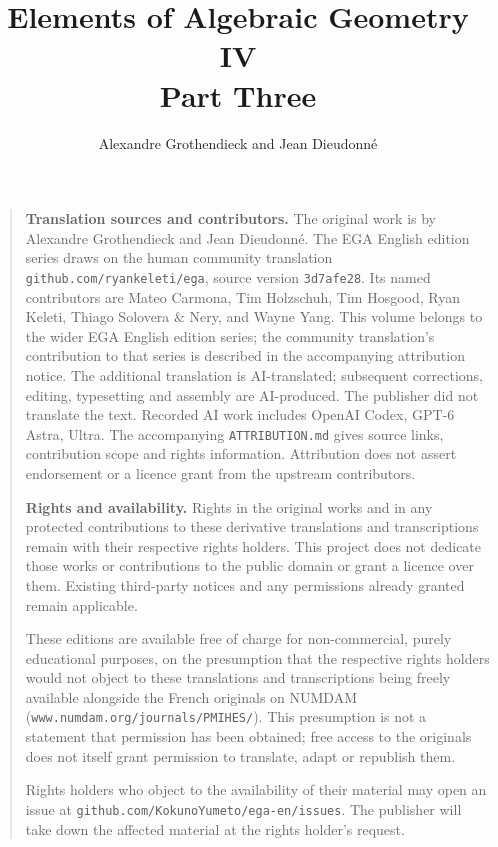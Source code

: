 


\setlength{\emergencystretch}{3em}




\title{Elements of Algebraic Geometry IV\\Part Three}
\author{Alexandre Grothendieck and Jean Dieudonn\'e}
\date{}
\maketitle


\begingroup
\small
\begin{quote}
\textbf{Translation sources and contributors.}
The original work is by Alexandre Grothendieck and Jean Dieudonn\'e.
The EGA English edition series draws on the human community translation
\texttt{github.com/ryankeleti/ega}, source version \texttt{3d7afe28}.
Its named contributors are Mateo Carmona, Tim Holzschuh, Tim Hosgood,
Ryan Keleti, Thiago Solovera \& Nery, and Wayne Yang.
This volume belongs to the wider EGA English edition series; the community translation's contribution to that series is described in the accompanying attribution notice.
The additional translation is AI-translated; subsequent corrections, editing,
typesetting and assembly are AI-produced. The publisher did not translate
the text. Recorded AI work includes OpenAI Codex,
GPT-6 Astra, Ultra.
The accompanying \texttt{ATTRIBUTION.md} gives source links, contribution
scope and rights information. Attribution does not assert endorsement
or a licence grant from the upstream contributors.

\medskip
\textbf{Rights and availability.}
Rights in the original works and in any protected contributions to these
derivative translations and transcriptions remain with their respective
rights holders. This project does not dedicate those works or contributions
to the public domain or grant a licence over them. Existing third-party
notices and any permissions already granted remain applicable.

These editions are available free of charge for non-commercial, purely
educational purposes, on the presumption that the respective rights holders
would not object to these translations and transcriptions being freely
available alongside the French originals on NUMDAM
(\texttt{www.numdam.org/journals/PMIHES/}). This presumption is not a statement
that permission has been obtained; free access to the originals does not
itself grant permission to translate, adapt or republish them.

Rights holders who object to the availability of their material may open
an issue at \texttt{github.com/KokunoYumeto/ega-en/issues}. The publisher
will take down the affected material at the rights holder's request.
\end{quote}
\endgroup


